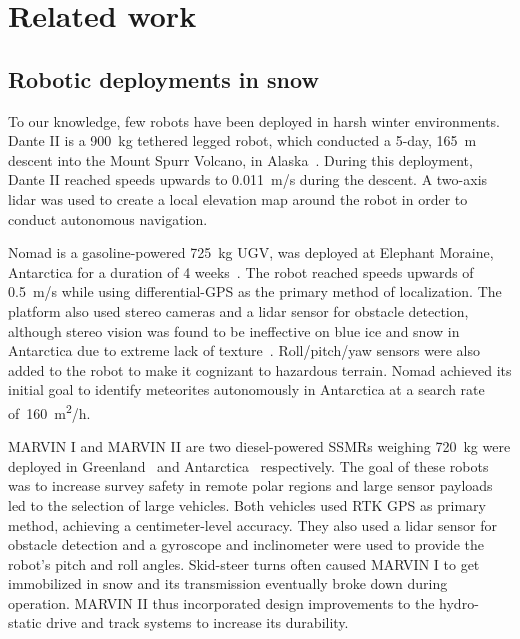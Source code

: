 \section{Related work}
\label{sec:rel_work}

\subsection{Robotic deployments in snow}
\label{sec:snow_robots}


To our knowledge, few robots have been deployed in harsh winter environments. 
Dante II is a \SI{900}{kg} tethered legged robot, which conducted a 5-day, \SI{165}{m} descent into the Mount Spurr Volcano, in Alaska~\citep{Bares1999}.
During this deployment, Dante II reached speeds upwards to \SI{0.011}{m/s} during the descent.
A two-axis lidar was used to create a local elevation map around the robot in order to conduct autonomous navigation.

Nomad is a gasoline-powered \SI{725}{kg} \ac{UGV}, was deployed at Elephant Moraine, Antarctica for a duration of 4 weeks~\citep{Apostolopoulos2000}. 
The robot reached speeds upwards of \SI{0.5}{m/s} while using differential-\ac{GPS} as the primary method of localization.
The platform also used stereo cameras and a lidar sensor for obstacle detection, although stereo vision was found to be ineffective  on blue ice and snow in Antarctica due to extreme lack of texture~\citep{Moorehead1999}.
Roll/pitch/yaw sensors were also added to the robot to make it cognizant to hazardous terrain.
Nomad achieved its initial goal to identify meteorites autonomously in Antarctica at a search rate of~\SI{160}{m^2/h}. %

MARVIN I and MARVIN II are two diesel-powered \acp{SSMR} weighing \SI{720}{kg} were deployed in Greenland~\citep{Stansbury2004} and Antarctica~\citep{Gifford2009} respectively. 
The goal of these robots was to increase survey safety in remote polar regions and large sensor payloads led to the selection of large vehicles.
Both vehicles used \ac{RTK} \ac{GPS} as primary method, achieving a centimeter-level accuracy.
They also used a lidar sensor for obstacle detection and a gyroscope and inclinometer were used to provide the robot's pitch and roll angles.
Skid-steer turns often caused MARVIN I to get immobilized in snow and its transmission eventually broke down during operation.
MARVIN II thus incorporated design improvements to the hydro-static drive and track systems to increase its durability.


